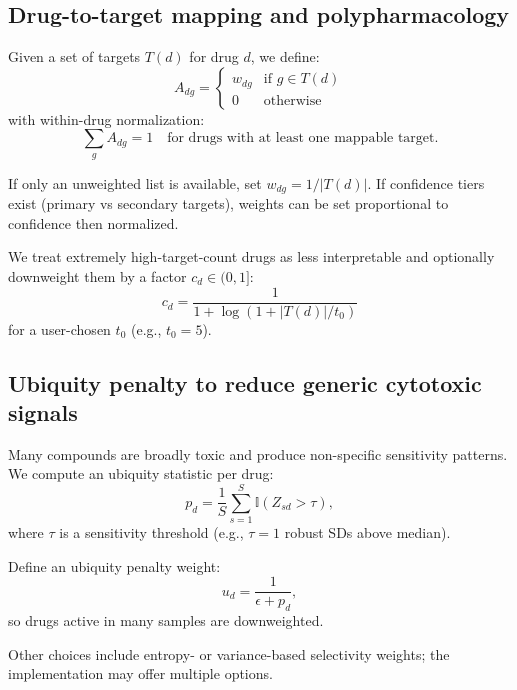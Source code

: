 \documentclass[11pt]{article}
\begin{document}
\subsection{Drug-to-target mapping and polypharmacology}
Given a set of targets $T(d)$ for drug $d$, we define:
\begin{equation}
A_{dg} =
\begin{cases}
w_{dg} & \text{if } g \in T(d) \\
0 & \text{otherwise}
\end{cases}
\end{equation}
with within-drug normalization:
\begin{equation}
\sum_g A_{dg} = 1 \quad \text{for drugs with at least one mappable target.}
\end{equation}

If only an unweighted list is available, set $w_{dg} = 1 / |T(d)|$.
If confidence tiers exist (primary vs secondary targets), weights can be set proportional to confidence then normalized.

We treat extremely high-target-count drugs as less interpretable and optionally downweight them by a factor $c_d \in (0,1]$:
\begin{equation}
c_d = \frac{1}{1 + \log(1 + |T(d)| / t_0)}
\end{equation}
for a user-chosen $t_0$ (e.g., $t_0 = 5$).

\subsection{Ubiquity penalty to reduce generic cytotoxic signals}
Many compounds are broadly toxic and produce non-specific sensitivity patterns. We compute an ubiquity statistic per drug:
\begin{equation}
p_d = \frac{1}{S} \sum_{s=1}^S \mathbb{I}(Z_{sd} > \tau),
\end{equation}
where $\tau$ is a sensitivity threshold (e.g., $\tau = 1$ robust SDs above median).

Define an ubiquity penalty weight:
\begin{equation}
u_d = \frac{1}{\epsilon + p_d},
\end{equation}
so drugs active in many samples are downweighted.

Other choices include entropy- or variance-based selectivity weights; the implementation may offer multiple options.
\end{document}
